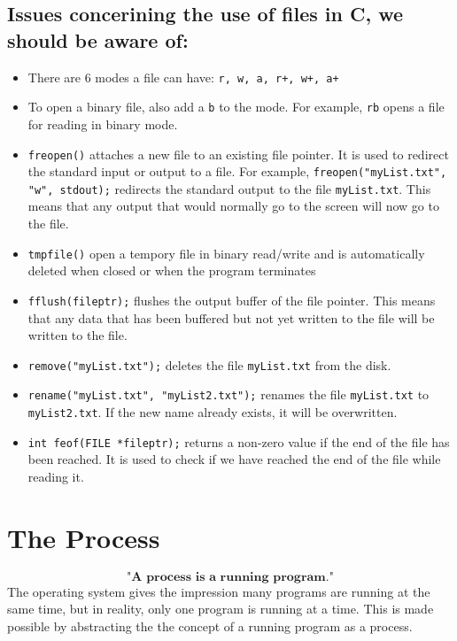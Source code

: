 \documentclass[a4paper, 10pt]{article}
\begin{document}
\subsection{Issues concerining the use of files in C, we should be aware of:}
\begin{itemize}
    \item There are 6 modes a file can have: \texttt{r, w, a, r+, w+, a+}
    \item To open a binary file, also add a \texttt{b} to the mode. For example, \texttt{rb} opens a file for reading in binary mode.
    \item \texttt{freopen()} attaches a new file to an existing file pointer. It is used to redirect the standard input or output to a file. For example, \texttt{freopen("myList.txt", "w", stdout);} redirects the standard output to the file \texttt{myList.txt}. This means that any output that would normally go to the screen will now go to the file.
    \item \texttt{tmpfile()} open a tempory file in binary read/write and is automatically deleted when closed or when the program terminates
    \item \texttt{fflush(fileptr);} flushes the output buffer of the file pointer. This means that any data that has been buffered but not yet written to the file will be written to the file.
    \item \texttt{remove("myList.txt");} deletes the file \texttt{myList.txt} from the disk.
    \item \texttt{rename("myList.txt", "myList2.txt");} renames the file \texttt{myList.txt} to \texttt{myList2.txt}. If the new name already exists, it will be overwritten.
    \item \texttt{int feof(FILE *fileptr);} returns a non-zero value if the end of the file has been reached. It is used to check if we have reached the end of the file while reading it.
\end{itemize}

\section{The Process}
$$\textbf{"A process is a running program."}$$
The operating system gives the impression many programs are running at the same time, but in reality, only one program is running at a time. This is made possible by abstracting the the concept of a running program as a process.
\end{document}
